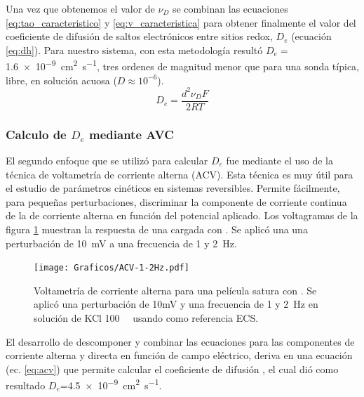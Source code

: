 		 Una vez que obtenemos el valor de  $\nu_{\scriptscriptstyle{D}}$ se combinan las ecuaciones \ref{eq:tao_caracteristico} y \ref{eq:v_caracteristica} para obtener finalmente el valor del coeficiente de difusión de saltos electrónicos entre sitios redox,  $D_e$ (ecuación \ref{eq:dh}). Para nuestro sistema, con esta metodología resultó $D_e=$\SI{1.6e-9}{\square\cm\per\second}, tres ordenes de magnitud menor que para una sonda típica, libre, en solución acuosa ($D\approx 10^{-6}$).  
			\begin{equation}
					D_e= \frac{d^2\nu_{\scriptscriptstyle{D}}F}{2RT}
					\label{eq:dh}
			\end{equation}
     
	 \subsubsection*{Calculo de $D_e$ mediante AVC}

    	 El segundo enfoque que se utilizó para calcular $D_e$ fue mediante el uso de la técnica de voltametría de corriente alterna (ACV). Esta técnica es muy útil para el estudio de parámetros cinéticos en sistemas reversibles. Permite fácilmente, para pequeñas perturbaciones, discriminar la componente de corriente continua de la de corriente alterna en función del potencial aplicado. Los voltagramas de la figura \ref{fig:acv} muestran la respuesta de una \pdmF\space cargada con \ru. Se aplicó una una perturbación de \SI{10}{\milli\volt} a una frecuencia de 1 y \SI{2}{\hertz}.

	 			\begin{figure}[b!]
					\centering
			 	    \texttt{[image: Graficos/ACV-1-2Hz.pdf]}
			        \caption[Voltametrías de corriente alterna]{Voltametría de corriente alterna para una película satura con \ru. Se aplicó una perturbación de 10mV y una frecuencia de 1 y \SI{2}{\hertz} en solución de KCl \SI{100}{\milli\Molar} usando como referencia ECS.}
			        \label{fig:acv}
			      	\end{figure}

    	 El desarrollo de descomponer y combinar las ecuaciones para las componentes de corriente alterna y directa en función de campo eléctrico, deriva en una ecuación (ec. \ref{eq:acv}) que permite calcular el coeficiente de difusión \cite{Wi2000}, el cual dió como resultado $D_e$=\SI{4.5e-9}{\square\cm\per\second}. 
    	 	
